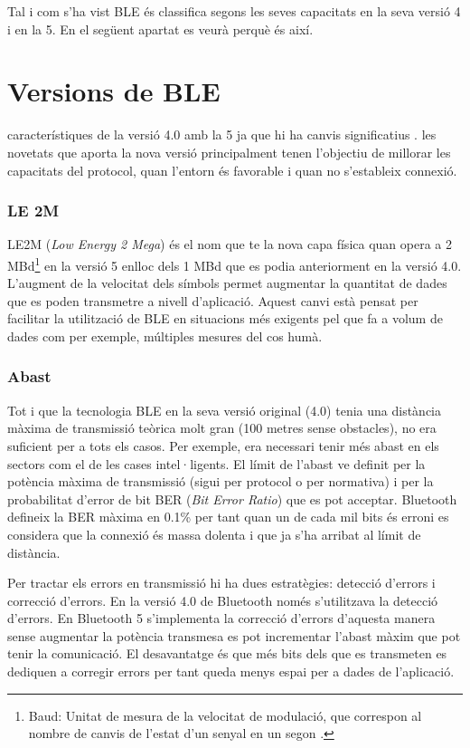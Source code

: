 Tal i com s'ha vist BLE és classifica segons les seves capacitats en la seva versió 4 i en la 5. En el següent apartat es veurà perquè és així.


\section{Versions de BLE}
\label{Versions_BLE}
característiques de la versió 4.0 amb la 5 ja que hi ha canvis significatius \cite{BLE_5_improvement_over_4}.
les novetats que aporta la nova versió principalment tenen l'objectiu de millorar les capacitats del protocol, quan l'entorn és favorable i quan no s'estableix connexió.

\subsubsection{LE 2M}
LE2M (\textit{Low Energy 2 Mega}) és el nom que te la nova capa física quan opera a 2 MBd\footnote{Baud: Unitat de mesura de la velocitat de modulació, que correspon al nombre de canvis de l'estat d'un senyal en un segon \cite{Baud_definition}.} en la versió 5 enlloc dels 1 MBd que es podia anteriorment en la versió 4.0.
L'augment de la velocitat dels símbols permet augmentar la quantitat de dades que es poden transmetre a nivell d'aplicació.
Aquest canvi està pensat per facilitar la utilització de BLE en situacions més exigents pel que fa a volum de dades com per exemple, múltiples mesures del cos humà.
 
\subsubsection{Abast}
Tot i que la tecnologia BLE en la seva versió original (4.0) tenia una distància màxima de transmissió teòrica molt gran (100 metres sense obstacles), no era suficient per a tots els casos.
Per exemple, era necessari tenir més abast en els sectors com el de les cases intel·ligents.
El límit de l'abast ve definit per la potència màxima de transmissió (sigui per protocol o per normativa) i per la probabilitat d'error de bit BER (\textit{Bit Error Ratio}) que es pot acceptar.
Bluetooth defineix la BER màxima en 0.1\% per tant quan un de cada mil bits és erroni es considera que la connexió és massa dolenta i que ja s'ha arribat al límit de distància.

Per tractar els errors en transmissió hi ha dues estratègies: detecció d'errors i correcció d'errors.
En la versió 4.0 de Bluetooth només s'utilitzava la detecció d'errors.
En Bluetooth 5 s'implementa la correcció d'errors d'aquesta manera sense augmentar la potència transmesa es pot incrementar l'abast màxim que pot tenir la comunicació.
El desavantatge és que més bits dels que es transmeten es dediquen a corregir errors per tant queda menys espai per a dades de l'aplicació.


